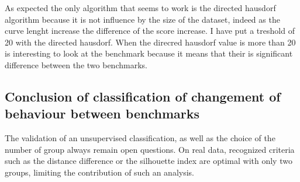 \documentclass{article}
\begin{document}
As expected the only algorithm that seems to work is the directed hausdorf algorithm because it is not influence by the size of the dataset, indeed as the curve lenght increase the difference of the score increase. 
I have put a treshold of 20 with the directed hausdorf. When the direcred hausdorf value is more than 20 is interesting to look at the benchmark because it means that their is significant difference between the two benchmarks.

\subsection{Conclusion of classification of changement of behaviour between benchmarks}

The validation of an unsupervised classification, as well as the choice of the number of group always remain open questions. On real data, recognized criteria such as the distance difference or the silhouette index are optimal with only two groups, limiting the contribution of such an analysis.






\end{document}
